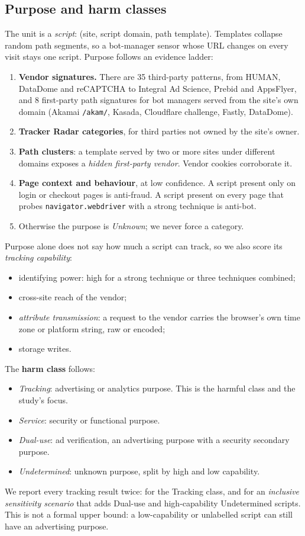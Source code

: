 \documentclass[sigconf,review,anonymous]{acmart}
\begin{document}
\subsection{Purpose and harm classes}
The unit is a \emph{script}: (site, script domain, path template). Templates collapse random
path segments, so a bot-manager sensor whose URL changes on every visit stays one script.
Purpose follows an evidence ladder:
\begin{enumerate}
\item \textbf{Vendor signatures.} There are 35 third-party patterns, from HUMAN, DataDome and
  reCAPTCHA to Integral Ad Science, Prebid and AppsFlyer, and 8 first-party path signatures
  for bot managers served from the site's own domain (Akamai \texttt{/akam/}, Kasada, Cloudflare
  challenge, Fastly, DataDome).
\item \textbf{Tracker Radar categories}, for third parties not owned by the site's owner.
\item \textbf{Path clusters}: a template served by two or more sites under different domains
  exposes a \emph{hidden first-party vendor}. Vendor cookies corroborate it.
\item \textbf{Page context and behaviour}, at low confidence. A script present only on login or
  checkout pages is anti-fraud. A script present on every page that probes
  \texttt{navigator.webdriver} with a strong technique is anti-bot.
\item Otherwise the purpose is \emph{Unknown}; we never force a category.
\end{enumerate}

Purpose alone does not say how much a script can track, so we also score its \emph{tracking
capability}:
\begin{itemize}
\item identifying power: high for a strong technique or three techniques combined;
\item cross-site reach of the vendor;
\item \emph{attribute transmission}: a request to the vendor carries the browser's own time zone
  or platform string, raw or encoded;
\item storage writes.
\end{itemize}
The \textbf{harm class} follows:
\begin{itemize}
\item \emph{Tracking}: advertising or analytics purpose. This is the harmful class and the study's
  focus.
\item \emph{Service}: security or functional purpose.
\item \emph{Dual-use}: ad verification, an advertising purpose with a security secondary purpose.
\item \emph{Undetermined}: unknown purpose, split by high and low capability.
\end{itemize}
We report every tracking result twice: for the Tracking class, and for an \emph{inclusive
sensitivity scenario} that adds Dual-use and high-capability Undetermined scripts. This is not
a formal upper bound: a low-capability or unlabelled script can still have an advertising purpose.
\end{document}
